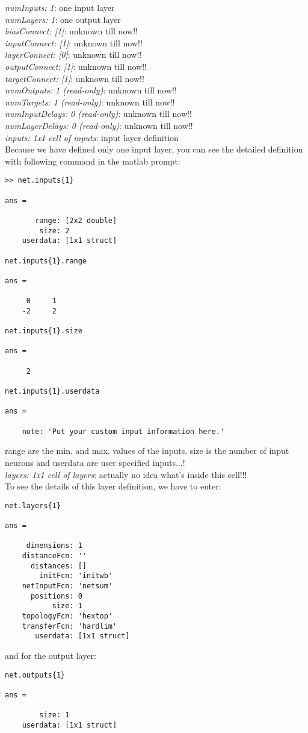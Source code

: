 \textit{numInputs: 1}: one input layer\\
\noindent \textit{numLayers: 1}: one output layer\\
\noindent \textit{biasConnect: [1]}: unknown till now!!\\
\noindent \textit{inputConnect: [1]}: unknown till now!!\\
\noindent \textit{layerConnect: [0]}: unknown till now!!\\
\noindent \textit{outputConnect: [1]}: unknown till now!!\\
\noindent \textit{targetConnect: [1]}: unknown till now!!\\
\noindent \textit{numOutputs: 1  (read-only)}: unknown till now!!\\
\noindent \textit{numTargets: 1  (read-only)}: unknown till now!!\\
\noindent \textit{numInputDelays: 0  (read-only)}: unknown till now!!\\
\noindent \textit{numLayerDelays: 0  (read-only)}: unknown till now!!\\
\noindent \textit{inputs: {1x1 cell} of inputs}: input layer definition\\
Because we have defined only one input layer, you can see the detailed definition with
following command in the matlab prompt:\\
\begin{verbatim}
>> net.inputs{1}

ans =

       range: [2x2 double]
        size: 2
    userdata: [1x1 struct]
    
net.inputs{1}.range

ans =

     0     1
    -2     2
    
net.inputs{1}.size

ans =

     2
     
net.inputs{1}.userdata

ans =

    note: 'Put your custom input information here.'
\end{verbatim}
range are the min. and max. values of the inputs. size is the number of input neurons and userdata are user specified inputs...!\\
\noindent \textit{layers: {1x1 cell} of layers}: actually no idea what's inside this cell!!!\\
To see the details of this layer definition, we have to enter:
\begin{verbatim}
net.layers{1}

ans = 

     dimensions: 1
    distanceFcn: ''
      distances: []
        initFcn: 'initwb'
    netInputFcn: 'netsum'
      positions: 0
           size: 1
    topologyFcn: 'hextop'
    transferFcn: 'hardlim'
       userdata: [1x1 struct]
\end{verbatim}
and for the output layer:
\begin{verbatim}
net.outputs{1}

ans = 

        size: 1
    userdata: [1x1 struct]
\end{verbatim}

